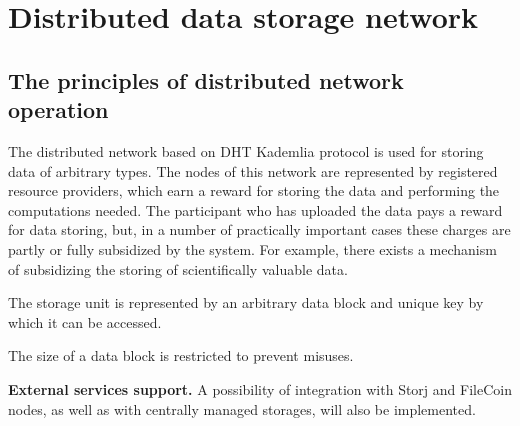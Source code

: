 ﻿\section{Distributed data storage network}

\subsection{The principles of distributed network operation}
The distributed network based on DHT Kademlia protocol is used for storing data of arbitrary types. The nodes of this network are represented by registered resource providers, which earn a reward for storing the data and performing the computations needed. The participant who has uploaded the data pays a reward for data storing, but, in a number of practically important cases these charges are partly or fully subsidized by the system. For example, there exists a mechanism of subsidizing the storing of scientifically valuable data.


The storage unit is represented by an arbitrary data block and unique key by which it can be accessed.

\begin{note}
 The size of a data block is restricted to prevent misuses.
\end{note}

\textbf{External services support.} A possibility of integration with Storj and FileCoin nodes, as well as with centrally managed storages, will also be implemented.



%
%
%
%

